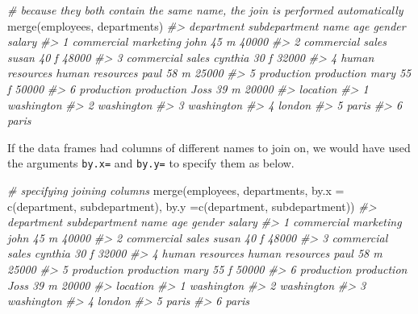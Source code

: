 \documentclass[
]{book}
\newenvironment{Shaded}{\begin{snugshade}}{\end{snugshade}}
\newcommand{\AttributeTok}[1]{\textcolor[rgb]{0.77,0.63,0.00}{#1}}
\newcommand{\CommentTok}[1]{\textcolor[rgb]{0.56,0.35,0.01}{\textit{#1}}}
\newcommand{\FunctionTok}[1]{\textcolor[rgb]{0.00,0.00,0.00}{#1}}
\newcommand{\NormalTok}[1]{#1}
\newcommand{\StringTok}[1]{\textcolor[rgb]{0.31,0.60,0.02}{#1}}
\begin{document}
\begin{Shaded}
\begin{Highlighting}[]
\CommentTok{\# because they both contain the same name, the join is performed automatically}
\FunctionTok{merge}\NormalTok{(employees, departments)}
\CommentTok{\#\textgreater{}        department   subdepartment    name age gender salary}
\CommentTok{\#\textgreater{} 1      commercial       marketing    john  45      m  40000}
\CommentTok{\#\textgreater{} 2      commercial           sales   susan  40      f  48000}
\CommentTok{\#\textgreater{} 3      commercial           sales cynthia  30      f  32000}
\CommentTok{\#\textgreater{} 4 human resources human resources    paul  58      m  25000}
\CommentTok{\#\textgreater{} 5      production      production    mary  55      f  50000}
\CommentTok{\#\textgreater{} 6      production      production    Joss  39      m  20000}
\CommentTok{\#\textgreater{}     location}
\CommentTok{\#\textgreater{} 1 washington}
\CommentTok{\#\textgreater{} 2 washington}
\CommentTok{\#\textgreater{} 3 washington}
\CommentTok{\#\textgreater{} 4     london}
\CommentTok{\#\textgreater{} 5      paris}
\CommentTok{\#\textgreater{} 6      paris}
\end{Highlighting}
\end{Shaded}

If the data frames had columns of different names to join on, we would have used the arguments \texttt{by.x=} and \texttt{by.y=} to specify them as below.

\begin{Shaded}
\begin{Highlighting}[]
\CommentTok{\# specifying joining columns}
\FunctionTok{merge}\NormalTok{(employees, departments, }
      \AttributeTok{by.x =} \FunctionTok{c}\NormalTok{(}\StringTok{\textquotesingle{}department\textquotesingle{}}\NormalTok{, }\StringTok{\textquotesingle{}subdepartment\textquotesingle{}}\NormalTok{), }
      \AttributeTok{by.y =}\FunctionTok{c}\NormalTok{(}\StringTok{\textquotesingle{}department\textquotesingle{}}\NormalTok{, }\StringTok{\textquotesingle{}subdepartment\textquotesingle{}}\NormalTok{))}
\CommentTok{\#\textgreater{}        department   subdepartment    name age gender salary}
\CommentTok{\#\textgreater{} 1      commercial       marketing    john  45      m  40000}
\CommentTok{\#\textgreater{} 2      commercial           sales   susan  40      f  48000}
\CommentTok{\#\textgreater{} 3      commercial           sales cynthia  30      f  32000}
\CommentTok{\#\textgreater{} 4 human resources human resources    paul  58      m  25000}
\CommentTok{\#\textgreater{} 5      production      production    mary  55      f  50000}
\CommentTok{\#\textgreater{} 6      production      production    Joss  39      m  20000}
\CommentTok{\#\textgreater{}     location}
\CommentTok{\#\textgreater{} 1 washington}
\CommentTok{\#\textgreater{} 2 washington}
\CommentTok{\#\textgreater{} 3 washington}
\CommentTok{\#\textgreater{} 4     london}
\CommentTok{\#\textgreater{} 5      paris}
\CommentTok{\#\textgreater{} 6      paris}
\end{Highlighting}
\end{Shaded}
\end{document}
